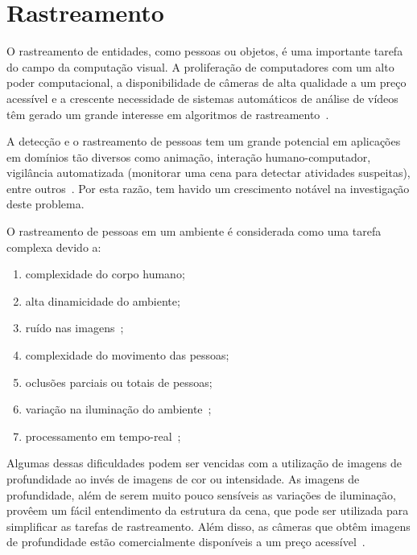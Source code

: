 \section {Rastreamento}	

	O rastreamento de entidades, como pessoas ou objetos, é uma importante tarefa do campo da computação visual. A proliferação de computadores com um alto poder computacional, a disponibilidade de câmeras de alta qualidade a um preço acessível e a crescente necessidade de sistemas automáticos de análise de vídeos têm gerado um grande interesse em algoritmos de rastreamento~\cite{yilmaz}.


	A detecção e o rastreamento de pessoas tem um grande potencial em aplicações em domínios tão diversos como animação, interação humano-computador, vigilância automatizada (monitorar uma cena para detectar atividades suspeitas), entre outros~\cite{yilmaz}. Por esta razão, tem havido um crescimento notável na investigação deste problema.

	O rastreamento de pessoas em um ambiente é considerada como uma tarefa complexa devido a:

		\begin{enumerate}
			\item complexidade do corpo humano;
			\item alta dinamicidade do ambiente;
			\item ruído nas imagens~\cite{yilmaz};
			\item complexidade do movimento das pessoas;
			\item oclusões parciais ou totais de pessoas;
			\item variação na iluminação do ambiente~\cite{yilmaz};
			\item processamento em tempo-real~\cite{yilmaz};
		\end{enumerate}

	Algumas dessas dificuldades podem ser vencidas com a utilização de imagens de profundidade ao invés de imagens de cor ou intensidade. As imagens de profundidade, além de serem muito pouco sensíveis as variações de iluminação, provêem um fácil entendimento da estrutura da cena, que pode ser utilizada para simplificar as tarefas de rastreamento. Além disso, as câmeras que obtêm imagens de profundidade estão comercialmente disponíveis a um preço acessível~\cite{nikos}.

